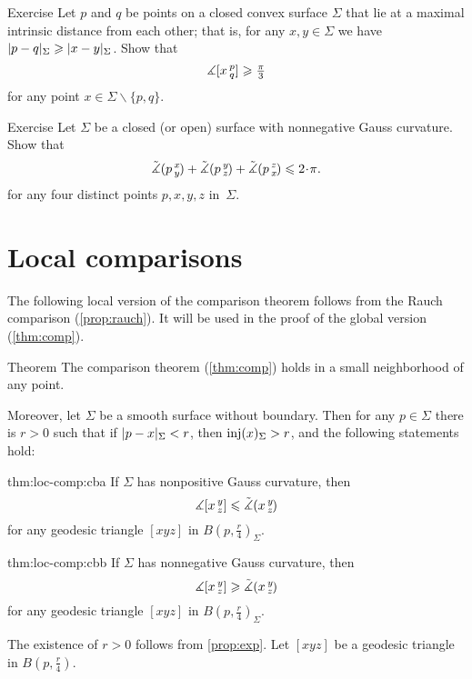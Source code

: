 \begin{thm}{Exercise}\label{ex:diam-angle}
Let $p$ and $q$ be points on a closed convex surface $\Sigma$ that lie at a maximal intrinsic distance from each other;
that is, for any $x,y\in \Sigma$ we have $\dist{p}{q}\Sigma\z\ge\dist{x}{y}\Sigma$.
Show that 
\[\measuredangle[x\,{}^{p}_{q}]\geqslant \tfrac\pi3\]
for any point $x\in \Sigma\backslash\{p,q\}$.
\end{thm}

\begin{thm}{Exercise}\label{ex:sum=<2pi}
Let $\Sigma$ be a closed (or open) surface with nonnegative Gauss curvature.
Show that 
\[\modangle pxy+\modangle pyz+\modangle pzx\le2\cdot \pi.\]
for any four distinct points $p,x,y,z$ in~$\Sigma$.
\end{thm}

\section{Local comparisons}\label{sec:loc-comp}

The following local version of the comparison theorem follows from the Rauch comparison (\ref{prop:rauch}).
It will be used in the proof of the global version (\ref{thm:comp}).

\begin{thm}{Theorem}\label{thm:loc-comp}
The comparison theorem (\ref{thm:comp}) holds in a small neighborhood of any point.

Moreover, let $\Sigma$ be a smooth surface without boundary.
Then for any $p\in \Sigma$ there is $r>0$ such that if $\dist{p}{x}\Sigma<r$, then $\mathop{\rm inj}\nolimits(x)_\Sigma>r$, and the following statements hold:

\begin{subthm}{thm:loc-comp:cba}
If $\Sigma$ has nonpositive Gauss curvature, then 
\[\measuredangle[x\,{}^{y}_{z}]\leqslant\tilde\measuredangle(x\,{}^{y}_{z}\hspace{-0.2ex})\]
for any geodesic triangle $[xyz]$ in $B(p,\tfrac r4)_\Sigma$.
\end{subthm}

\begin{subthm}{thm:loc-comp:cbb}
If $\Sigma$ has nonnegative Gauss curvature, then 
\[\measuredangle[x\,{}^{y}_{z}]\geqslant\tilde\measuredangle(x\,{}^{y}_{z}\hspace{-0.2ex})\]
for any geodesic triangle $[xyz]$ in $B(p,\tfrac r4)_\Sigma$.
\end{subthm}

\end{thm}

The existence of $r>0$ follows from \ref{prop:exp}.
Let $[xyz]$ be a geodesic triangle in $B(p,\tfrac{r}4)$.

